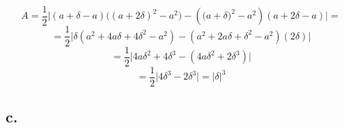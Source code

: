 \documentclass{article}
\begin{document}
\begin{equation*}
    A = \frac{1}{2}\Big|(a + \delta - a)\Big((a + 2\delta)^{2} - a^{2}\Big) - (\Big(a + \delta\Big)^{2} - a^{2})(a + 2\delta - a)\Big| =
\end{equation*}
\begin{equation*}
    = \frac{1}{2}\Big|\delta(a^{2} + 4a\delta + 4\delta^{2} - a^{2}) - (a^{2} + 2a\delta + \delta^{2} - a^{2})(2\delta)\Big|
\end{equation*}
\begin{equation*}
    = \frac{1}{2}\Big|4a\delta^{2} + 4\delta^{3} - (4a\delta^{2} + 2\delta^{3})\Big|
\end{equation*}
\begin{equation*}
    = \frac{1}{2}\Big|4\delta^{3} - 2\delta^{3}\Big| = \Big|\delta\Big|^{3}
\end{equation*}


\subsection*{c.}
\end{document}
